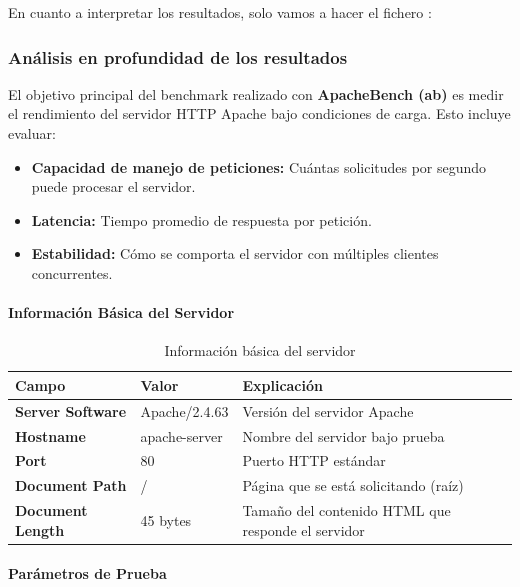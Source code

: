En cuanto a interpretar los resultados, solo vamos a hacer el fichero : 

\subsubsection*{Análisis en profundidad de los resultados}

El objetivo principal del benchmark realizado con \textbf{ApacheBench (ab)} es medir el rendimiento del servidor HTTP Apache bajo condiciones de carga. Esto incluye evaluar:

\begin{itemize}
    \item \textbf{Capacidad de manejo de peticiones:} Cuántas solicitudes por segundo puede procesar el servidor.
    \item \textbf{Latencia:} Tiempo promedio de respuesta por petición.
    \item \textbf{Estabilidad:} Cómo se comporta el servidor con múltiples clientes concurrentes.
\end{itemize}

\paragraph{Información Básica del Servidor}

\begin{table}[H]
\centering
\begin{tabular}{|p{5cm}|p{5cm}|p{5cm}|}
\hline
\textbf{Campo} & \textbf{Valor} & \textbf{Explicación} \\ \hline
\textbf{Server Software} & Apache/2.4.63 & Versión del servidor Apache \\ \hline
\textbf{Hostname} & apache-server & Nombre del servidor bajo prueba \\ \hline
\textbf{Port} & 80 & Puerto HTTP estándar \\ \hline
\textbf{Document Path} & / & Página que se está solicitando (raíz) \\ \hline
\textbf{Document Length} & 45 bytes & Tamaño del contenido HTML que responde el servidor \\ \hline
\end{tabular}
\caption{Información básica del servidor}
\end{table}

\paragraph{Parámetros de Prueba}

